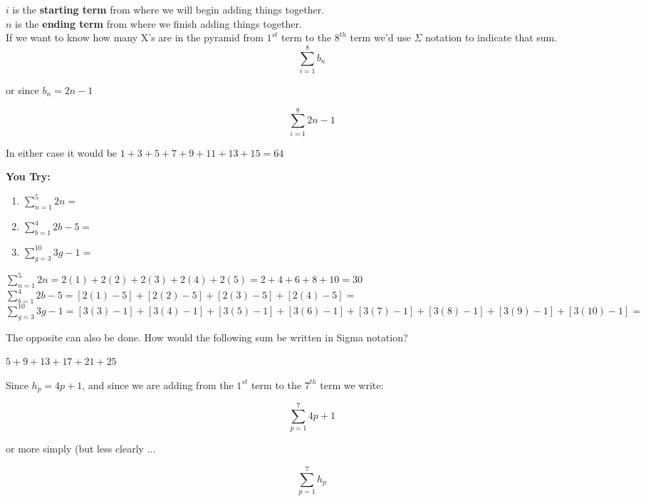 \documentclass[12pt]{article}
\begin{document}
$i$ is the \textbf{starting term} from where we will begin adding things together.\\

$n$ is the \textbf{ending term} from where we finish adding things together.\\


If we want to know how many X's are in the pyramid from $1^{st}$ term to the $8^{th}$ term we'd use $\Sigma$ notation to indicate that sum.\\

$$\sum\limits_{i=1}^{8}b_n$$

or since $b_n=2n-1$

$$\sum\limits_{i=1}^{8}2n-1$$

In either case it would be $1+3+5+7+9+11+13+15=64$\\

\pagebreak


\textbf{You Try:}

\begin{enumerate}
 
 \item $\sum\limits_{n=1}^{5} 2n =$
 
 \item $\sum\limits_{b=1}^{4} 2b-5 =$
 
 \item $\sum\limits_{g=3}^{10} 3g-1 = $\\
\end{enumerate}

$\sum\limits_{n=1}^{5} 2n = 2(1) + 2(2) + 2(3) + 2(4) + 2(5) = 2+4+6+8+10 = 30$\\

$\sum\limits_{b=1}^{4} 2b-5 = [2(1)-5] + [2(2)-5] + [2(3)-5] + [2(4)-5] = $\\

$\sum\limits_{g=3}^{10} 3g-1 = [3(3)-1] + [3(4)-1] +[3(5)-1] +[3(6)-1] +[3(7)-1] +[3(8)-1] +[3(9)-1] +[3(10)-1] =$\\

\vspace{.7in}

The opposite can also be done. How would the following sum be written in Sigma notation?

$5+9+13+17+21+25$\\

\begin{addmargin}[4em]{1em}

	Since $h_p=4p+1$, and since we are adding from the $1^{st}$ term to the $7^{th}$ term we write:

	$$\sum\limits_{p=1}^{7} 4p+1 $$

	or more simply (but less clearly ...

	$$\sum\limits_{p=1}^{7} h_p$$
\end{addmargin}
\end{document}
